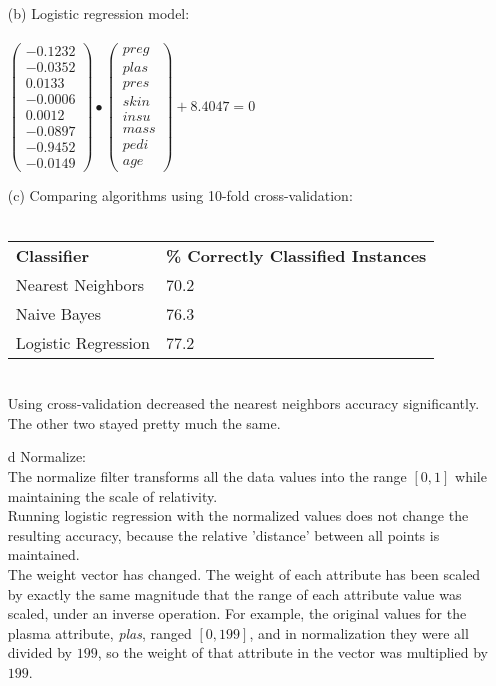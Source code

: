 \documentclass[12pt]{article}
\begin{document}
\begin{enumerate}
\begin{enumerate}
  	\item[(b)] Logistic regression model: \\ \\
	  	\begin{math}
			\left(
	  			\begin{array}{r}
	  				-0.1232 \\
	  				-0.0352 \\
	  				0.0133 \\
	  				-0.0006 \\
	  				0.0012 \\
	  				-0.0897 \\
	  				-0.9452 \\
	  				-0.0149 
	  			\end{array}  		
	  		\right)
	  		\bullet
	  		\left(
	  			\begin{array}{r}
	  				preg \\
	  				plas \\
	  				pres \\
	  				skin \\
	  				insu \\
	  				mass \\
	  				pedi \\
	  				age 
	  			\end{array}
	  		\right)
	  		+ 8.4047 = 0	  		
	  	\end{math} \\
	\item[(c)] Comparing algorithms using 10-fold cross-validation: \\ \\
  		\begin{tabular}{l l}
  			\textbf{Classifier} & \textbf{\% Correctly Classified Instances} \\
  			Nearest Neighbors & 70.2 \\
  			Naive Bayes & 76.3 \\
  			Logistic Regression & 77.2
  		\end{tabular} \\
  		
  		Using cross-validation decreased the nearest neighbors accuracy significantly. The other two stayed pretty much the same. 
  		
  	\item[{d}] Normalize: \\
	  	The normalize filter transforms all the data values into the range $[0,1]$ while maintaining the scale of relativity. \\
	  	Running logistic regression with the normalized values does not change the resulting accuracy, because the relative 'distance' between all points is maintained. \\
	  	The weight vector has changed. The weight of each attribute has been scaled by exactly the same magnitude that the range of each attribute value was scaled, under an inverse operation. For example, the original values for the plasma attribute, \textit{plas}, ranged $[0,199]$, and in normalization they were all divided by $199$, so the weight of that attribute in the vector was multiplied by $199$. \\
	 

\end{enumerate}
\end{enumerate}
\end{document}
